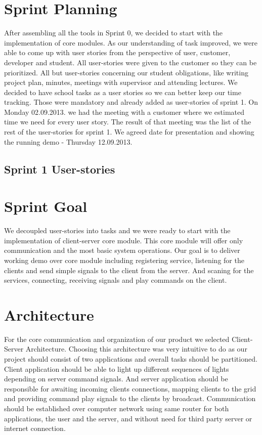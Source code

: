 \section{Sprint Planning}
After assembling all the tools in Sprint 0, we decided to start with the implementation of core modules.
As our understanding of task improved, we were able to come up with user stories from the perspective of user, customer, developer and student.
All user-stories were given to the customer so they can be prioritized. 
All but user-stories concerning our student obligations, like writing project plan, minutes, meetings with supervisor and attending lectures.
We decided to have school tasks as a user stories so we can better keep our time tracking. 
Those were mandatory and already added as user-stories of sprint 1.
On Monday 02.09.2013. we had the meeting with a customer where we estimated time we need for every user story.
The result of that meeting was the list of the rest of the user-stories for sprint 1.
We agreed date for presentation and showing the running demo - Thursday 12.09.2013.

\subsection{Sprint 1 User-stories}


\section{Sprint Goal}
We decoupled user-stories into tasks and we were ready to start with the implementation of client-server core module.
This core module will offer only communication and the most basic system operations. 
Our goal is to deliver working demo over core module including registering service, listening for the clients and send simple signals to the client from the server.
And scaning for the services, connecting, receiving signals and play commands on the client. 

\section{Architecture}

For the core communication and organization of our product we selected Client-Server Architecture.
Choosing this architecture was very intuitive to do as our project should consist of two applications and overall tasks should be partitioned. 
Client application should be able to light up different sequences of lights depending on server command signals.
And server application should be responsible for awaiting incoming clients connections, mapping clients to the grid and providing command play signals to the clients by broadcast.
Communication should be established over computer network using same router for both applications, the user and the server, and without need for third party server or internet connection. 


